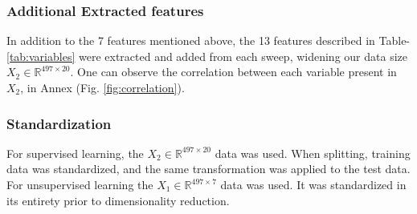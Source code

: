 \documentclass{IEEEtran}
\begin{document}
\subsubsection{Additional Extracted features}
In addition to the 7 features mentioned above, the 13 features described in Table-\ref{tab:variables} were extracted and added from each sweep, widening our data size $X_2 \in \mathbb{R}^{497\times20}$.
One can observe the correlation between each variable present in $X_2$, in Annex (Fig. \ref{fig:correlation}). 

\subsubsection{Standardization}
For supervised learning, the $X_2 \in \mathbb{R}^{497\times20}$ data was used. When splitting, training data was standardized, and the same transformation was applied to the test data.
For unsupervised learning the $X_1 \in \mathbb{R}^{497\times7}$ data was used. It was standardized in its entirety prior to dimensionality reduction.
\end{document}
